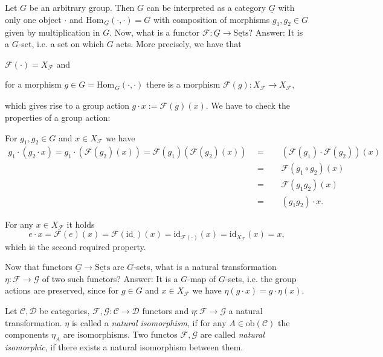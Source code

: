 \documentclass[11pt]{book}
\numberwithin{dummy}{section}
\theoremstyle{nonumberbreak}
\newenvironment{defin}[1][]{\ifthenelse{\equal{#1}{}}{\definition}{\definition[#1]}\rm}{\enddefinition}
\newenvironment{ex}[1][]{\ifthenelse{\equal{#1}{}}{\example}{\example[#1]}\rm}{\endexample}
\newcommand{\Hom}{\mathrm{Hom}\hspace{1pt}}
\newcommand{\sets}{\underline{\mathrm{Sets}}}
\newcommand{\C}{\mathcal{C}}
\newcommand{\D}{\mathcal{D}}
\newcommand{\F}{\mathcal{F}}
\newcommand{\G}{\mathcal{G}}
\newcommand{\obc}{\mathrm{ob}(\mathcal{C})}
\newcommand{\la}{\longrightarrow}
\newcommand{\id}{\mathrm{id}}
\begin{document}
\begin{spacing}{1.4}
\begin{ex}
Let $G$ be an arbitrary group. Then $G$ can be interpreted as a category $\underline{G}$ with only one object $\cdot$ and $\Hom_{\underline{G}}(\cdot, \cdot) = G$ with composition of morphisms $g_1, g_2 \in G$ given by multiplication in $G$. Now, what is a functor $\F: \underline{G} \la \sets$? Answer: It is a $G$-set, i.e. a set on which $G$ acts. More precisely, we have that 
\begin{compactenum}
\item $\F(\cdot) = X_{\F}$ and
\item for a morphism $g \in G= \Hom_{\underline{G}}(\cdot, \cdot)$ there is a morphism $\F(g): X_{\F} \la X_{\F}$,
\end{compactenum}
which gives rise to a group action $g \cdot x := \F(g) (x)$. We have to check the properties of a group action:
\begin{compactenum}
\item For $g_1, g_2 \in G$ and $x \in X_{\F}$ we have 
\setlength{\abovedisplayskip}{5.5pt}
\setlength{\belowdisplayskip}{5.5pt}
\begin{alignat*}{5}
g_1 \cdot (g_2 \cdot x) = g_1 \cdot \left( \F(g_2)(x) \right) = \F(g_1)\left( \F(g_2)(x)\right) \ \ &=&& \ \ \left( \F(g_1) \cdot \F(g_2) \right)(x) \\
&=&& \ \ \F(g_1 \circ g_2)(x) \\
&=&& \ \ \F(g_1g_2)(x) \\
&=&& \ \ (g_1g_2) \cdot x.
\end{alignat*}

\item For any $x \in X_{\F}$ it holds
$$e \cdot x = \F(e)(x) = \F(\id_{\cdot})(x) = \id_{\F(\cdot)}(x) = \id_{X_{\F}}(x) = x,$$
which is the second required property.
\end{compactenum}
Now that functors $\underline{G} \la \sets$ are $G$-sets, what is a natural transformation $\eta: \F \la \G$ of two such functors? Answer: It is a $G$-map of $G$-sets, i.e. the group actions are preserved, since for $g \in G$ and $x \in X_{\F}$ we have $\eta(g \cdot x) = g \cdot \eta(x)$.


\end{ex}


\begin{defin}   %
Let $\C, \D$ be categories, $\F, \G: \C \la \D$ functors and $\eta: \F \la \G$ a natural transformation. $\eta$ is called a \textit{natural isomorphism}, if for any $A \in \obc$ the components $\eta_A$ are isomorphisms. Two functos $\F, \G$ are called \textit{natural isomorphic}, if there exists a natural isomorphism between them.


\end{defin}
\end{spacing}
\end{document}
